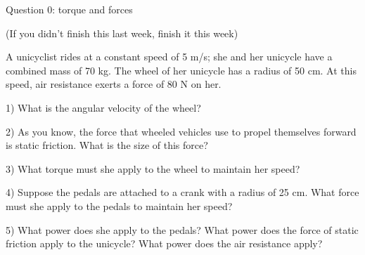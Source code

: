 \documentclass[12pt]{article}
\begin{document}
\Large
\centerline{}
\normalsize
\centerline{}
\small

\medskip

\centerline{\large Question 0: torque and forces}

\centerline{(If you didn't finish this last week, finish it this week)}

 A unicyclist rides at a constant speed of 5 m/s; she and her unicycle have a combined mass of 70 kg. The wheel of her unicycle has a radius of 50 cm. At this speed, air resistance exerts a force of 80 N on her.

       1) What is the angular velocity of the wheel?
\vspace{1.2in}

       2) As you know, the force that wheeled vehicles use to propel themselves forward is static friction. What is the size of this force?
\vspace {1.2in}

       3) What torque must she apply to the wheel to maintain her speed?
\vspace{2in}

\newpage

       4) Suppose the pedals are attached to a crank with a radius of 25 cm. What force must she apply to the pedals to maintain her speed?
\vspace{3in}

       5) What power does she apply to the pedals? What power does the force of static friction apply to the unicycle? What power does the air resistance apply?

 \newpage
\end{document}
